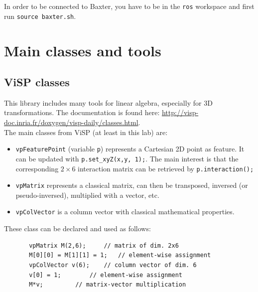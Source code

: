 \documentclass{ecnreport}
\begin{document}
In order to be connected to Baxter, you have to be in the \texttt{ros} workspace and first run \texttt{source baxter.sh}. 

\appendix

\section{Main classes and tools}\label{sec:classes}

\subsection{ViSP classes}

This library includes many tools for linear algebra, especially for 3D transformations. 
The documentation is found here: \url{http://visp-doc.inria.fr/doxygen/visp-daily/classes.html}.\\
The main classes from ViSP (at least in this lab) are:
\begin{itemize}
\item \texttt{vpFeaturePoint} (variable \texttt{p}) represents a Cartesian 2D point as feature. It can be updated with \texttt{p.set\_xyZ(x,y, 1);}. The main interest is that the corresponding $2\times 6$ interaction matrix can be retrieved by \texttt{p.interaction();}
\item \texttt{vpMatrix} represents a classical matrix, can then be transposed, inversed (or pseudo-inversed), multiplied with a vector, etc.
\item \texttt{vpColVector} is a column vector with classical mathematical properties.
\end{itemize}
These class can be declared and used as follows:
\begin{center}\cppstyle
\begin{lstlisting}
       vpMatrix M(2,6); 	// matrix of dim. 2x6
       M[0][0] = M[1][1] = 1;	// element-wise assignment
       vpColVector v(6);	// column vector of dim. 6
       v[0] = 1;		// element-wise assignment
       M*v;			// matrix-vector multiplication
\end{lstlisting}
\end{center}
%
\end{document}
